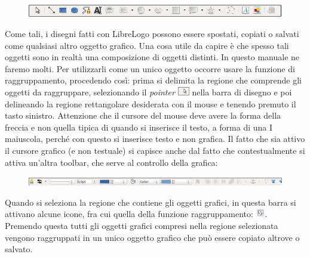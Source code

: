 \begin{figure}[h]
   \centering
   \includegraphics[width=12.0cm]{./images/librelogo/DrawToolbar.png}
   \label{DrawToolbar}
\end{figure}

Come tali, i disegni fatti con LibreLogo possono essere spostati, copiati o salvati come qualsiasi altro oggetto grafico. Una cosa utile da capire è che spesso tali oggetti sono in realtà una composizione di oggetti distinti. In questo manuale ne faremo molti. Per utilizzarli come un unico oggetto occorre usare la funzione di raggruppamento, procedendo così: prima si delimita la regione che comprende gli oggetti da raggruppare, selezionando il \textit{pointer} \includegraphics[height=1em]{./images/librelogo/Pointer_LO.png} nella barra di disegno e poi delineando la regione rettangolare desiderata con il mouse e tenendo premuto il tasto sinistro. Attenzione che il cursore del mouse deve avere la forma della freccia e non quella tipica di quando si inserisce il testo, a forma di una I maiuscola, perché con questo si inserisce testo e non grafica. Il fatto che sia attivo il cursore grafico (e non testuale) si capisce anche dal fatto che contestualmente si attiva un'altra toolbar, che serve al controllo della grafica:

\begin{figure}[h]
   \centering
   \includegraphics[width=12.0cm]{./images/librelogo/DrawToolbar2.png}
   \label{DrawToolbar2}
\end{figure}

Quando si seleziona la regione che contiene gli oggetti grafici, in questa barra si attivano alcune icone, fra cui quella della funzione raggruppamento: \includegraphics[height=1em]{./images/librelogo/RaggruppamentoLO.png}. Premendo questa tutti gli oggetti grafici compresi nella regione selezionata vengono raggruppati in un unico oggetto grafico che può essere copiato altrove o salvato. 

